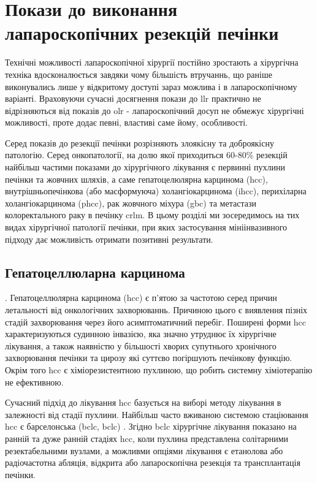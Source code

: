 \section{Покази до виконання лапароскопічних резекцій печінки}

Технічні можливості лапароскопічної хірургії постійно зростають а хірургічна техніка вдосконалюється завдяки чому більшість втручаннь, що раніше виконувались лише у відкритому доступі зараз можлива і в лапароскопічному варіанті. Враховуючи сучасні досягнення покази до \acrshort{llr} практично не відрізняються від показів до \acrshort{olr} - лапароскопічний досуп не обмежує хірургічні можливості, проте додає певні, властиві саме йому, особливості. 

Серед показів до резекції печінки розрізняють злоякісну та доброякісну патологію. Серед онкопатології, на долю якої приходиться 60-80\% резекцій  найбільш частими показами до хірургічного лікування є первинні пухлини печінки та жовчних шляхів, а саме гепатоцелюлярна карцинома (\acrshort{hcc}), внутрішньопечінкова (або масформуюча) холангіокарцинома (\acrshort{ihcc}), перихіларна холангіокарцинома (\acrshort{phcc}), рак жовчного міхура (\acrshort{gbc}) та метастази колоректального раку в печінку \acrshort{crlm}. 
В цьому розділі ми зосередимось на тих видах хірургічної патології печінки, при яких застосування мініінвазивного підходу дає можливість отримати позитивні результати. 

\subsection{Гепатоцеллюларна карцинома}.
Гепатоцеллюлярна карцинома (\acrshort{hcc}) є п'ятою за частотою серед причин летальності від онкологічних захворюваннь. Причиною цього є  виявлення пізніх стадій захворювання через його асимптоматичний перебіг. Поширені форми \acrshort{hcc} характеризуються судинною інвазією, яка значно утруднює їх хірургічне лікування, а також наявністю у більшості хворих супутнього хронічного захворювання печінки та цирозу які суттєво погіршують печінкову функцію. Окрім того \acrshort{hcc} є хіміорезистентною пухлиною, що робить системну хіміотерапію не ефективною.

Сучасний підхід до лікування \acrshort{hcc} базується на виборі методу лікування в залежності від стадії пухлини. Найбільш часто вживаною системою стаціювання \acrshort{hcc} є барселонська (\acrfull{bclc}, \acrshort{bclc}) \cite{Llovet2003}. Згідно \acrshort{bclc} хірургічне лікування показано на ранній та дуже ранній стадіях \acrshort{hcc}, коли пухлина представлена солітарними резектабельними вузлами, а можливми опціями лікування є етанолова або радіочастотна абляція, відкрита або лапароскопічна резекція та трансплантація печінки. 

